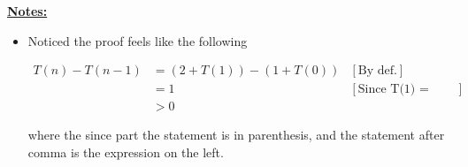 \documentclass[12pt]{article}
\begin{document}
\begin{itemize}












\end{itemize}

\bigskip

\underline{\textbf{Notes:}}

\bigskip

\begin{itemize}
    \item Noticed the proof feels like the following

    \begin{mdframed}
    \begin{align}
        T(n) - T(n-1) &= (2 + T(1)) - (1 + T(0)) & [\text{By def.}]\\
        &= 1 & [\text{Since T(1) = T(0) = 0 by def.}]\\
        &> 0
    \end{align}
    \end{mdframed}

    \bigskip

    where the since part the statement is in parenthesis, and the statement
    after comma is the expression on the left.
\end{itemize}
\end{document}
